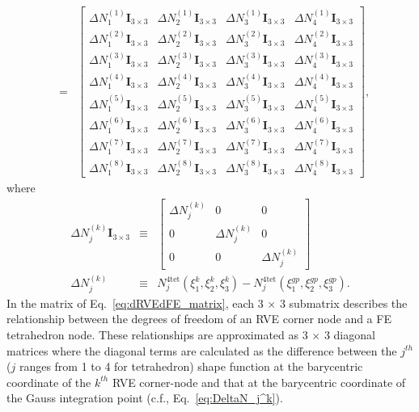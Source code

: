 \begin{eqnarray}
%
&=&\begin{bmatrix}
\Delta N_1^{(1)} \pmb{I}_{3\times3} & \Delta N_2^{(1)}\pmb{I}_{3\times3} & \Delta N_3^{(1)} \pmb{I}_{3\times3} & \Delta N_4^{(1)}\pmb{I}_{3\times3} \\
%
\Delta N_1^{(2)} \pmb{I}_{3\times3} & \Delta N_2^{(2)}\pmb{I}_{3\times3} & \Delta N_3^{(2)} \pmb{I}_{3\times3} & \Delta N_4^{(2)}\pmb{I}_{3\times3} \\
%
\Delta N_1^{(3)} \pmb{I}_{3\times3} & \Delta N_2^{(3)}\pmb{I}_{3\times3} & \Delta N_3^{(3)} \pmb{I}_{3\times3} & \Delta N_4^{(3)}\pmb{I}_{3\times3} \\
%
\Delta N_1^{(4)} \pmb{I}_{3\times3} & \Delta N_2^{(4)}\pmb{I}_{3\times3} & \Delta N_3^{(4)} \pmb{I}_{3\times3} & \Delta N_4^{(4)}\pmb{I}_{3\times3} \\
%
\Delta N_1^{(5)} \pmb{I}_{3\times3} & \Delta N_2^{(5)}\pmb{I}_{3\times3} & \Delta N_3^{(5)} \pmb{I}_{3\times3} & \Delta N_4^{(5)}\pmb{I}_{3\times3} \\
%
\Delta N_1^{(6)} \pmb{I}_{3\times3} & \Delta N_2^{(6)}\pmb{I}_{3\times3} & \Delta N_3^{(6)} \pmb{I}_{3\times3} & \Delta N_4^{(6)}\pmb{I}_{3\times3} \\
%
\Delta N_1^{(7)} \pmb{I}_{3\times3} & \Delta N_2^{(7)}\pmb{I}_{3\times3} & \Delta N_3^{(7)} \pmb{I}_{3\times3} & \Delta N_4^{(7)}\pmb{I}_{3\times3} \\
%
\Delta N_1^{(8)} \pmb{I}_{3\times3} & \Delta N_2^{(8)}\pmb{I}_{3\times3} & \Delta N_3^{(8)} \pmb{I}_{3\times3} & \Delta N_4^{(8)}\pmb{I}_{3\times3} 
\end{bmatrix},
\label{eq:dRVEdFE_matrix}
\end{eqnarray}
%
where
%
\begin{eqnarray}
\Delta N_j^{(k)} \pmb{I}_{3\times3} &\equiv&
\begin{bmatrix}
\Delta N_j^{(k)} & 0 & 0 \\
0 & \Delta N_j^{(k)} & 0 \\
0 & 0 & \Delta N_j^{(k)} 
\end{bmatrix} \nonumber\\
%
\Delta N_j^{(k)} &\equiv& N_j^{4\text{tet}}(\xi_1^k,\xi_2^k,\xi_3^k) - N_j^{4\text{tet}}(\xi_1^{gp},\xi_2^{gp},\xi_3^{gp}) .
\label{eq:DeltaN_j^k}
\end{eqnarray}
%
In the matrix of Eq.\ \eqref{eq:dRVEdFE_matrix}, each 3 $\times$ 3 submatrix describes the relationship between the degrees of freedom of an RVE corner node and a FE tetrahedron node. These relationships are approximated as 3 $\times$ 3 diagonal matrices where the diagonal terms are calculated as the difference between the $j^{th}$ ($j$ ranges from 1 to 4 for tetrahedron) shape function at the barycentric coordinate of the $k^{th}$ RVE corner-node and that at the barycentric coordinate of the Gauss integration point (c.f., Eq.\ \eqref{eq:DeltaN_j^k}). 